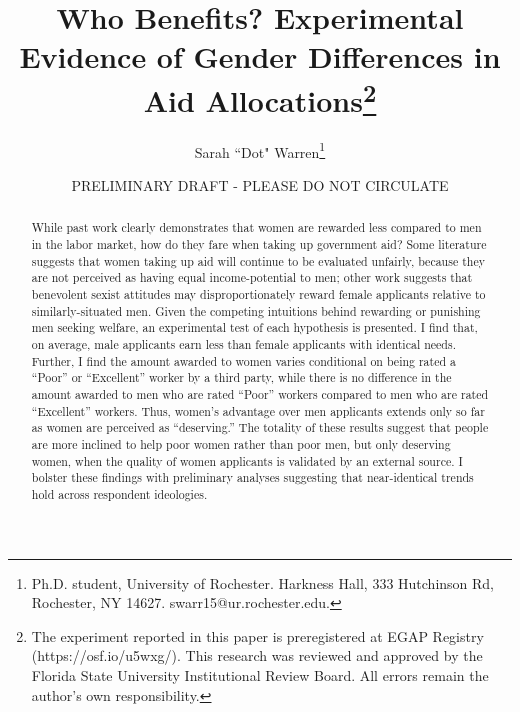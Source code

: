 \documentclass[12pt]{article}%
\author{Sarah ``Dot" Warren\thanks{Ph.D. student, University of Rochester. Harkness Hall, 333 Hutchinson Rd, Rochester, NY 14627. swarr15@ur.rochester.edu.}}
\title{Who Benefits? Experimental Evidence of Gender Differences in Aid Allocations\thanks{The experiment reported in this paper is preregistered at EGAP Registry (https://osf.io/u5wxg/). This research was reviewed and approved by the Florida State University Institutional Review Board. All errors remain the author's own responsibility.}}
\date{PRELIMINARY DRAFT - PLEASE DO NOT CIRCULATE}
\begin{document}
\maketitle
\thispagestyle{empty}


\begin{abstract}
While past work clearly demonstrates that women are rewarded less compared to men in the labor market, how do they fare when taking up government aid? Some literature suggests that women taking up aid will continue to be evaluated unfairly, because they are not perceived as having equal income-potential to men; other work suggests that benevolent sexist attitudes may disproportionately reward female applicants relative to similarly-situated men. Given the competing intuitions behind rewarding or punishing men seeking welfare, an experimental test of each hypothesis is presented. I find that, on average, male applicants earn less than female applicants with identical needs. Further, I find the amount awarded to women varies conditional on being rated a ``Poor” or ``Excellent” worker by a third party, while there is no difference in the amount awarded to men who are rated ``Poor” workers compared to men who are rated ``Excellent” workers. Thus, women’s advantage over men applicants extends only so far as women are perceived as ``deserving.” The totality of these results suggest that people are more inclined to help poor women rather than poor men, but only deserving women, when the quality of women applicants is validated by an external source. I bolster these findings with preliminary analyses suggesting that near-identical trends hold across respondent ideologies. %
\end{abstract}


\newpage

\end{document}
